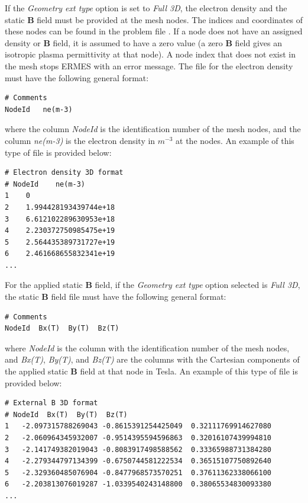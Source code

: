 If the \emph{Geometry ext type} option is set to \textit{Full 3D}, the electron density and the static \textbf{B} field must be provided at the mesh nodes. The indices and coordinates of these nodes can be found in the problem file . If a node does not have an assigned density or \textbf{B} field, it is assumed to have a zero value (a zero \textbf{B} field gives an isotropic plasma permittivity at that node). A node index that does not exist in the mesh stops ERMES with an error message. The file for the electron density must have the following general format:
\begin{small}\begin{lstlisting}
# Comments	 
NodeId   ne(m-3) 
\end{lstlisting}\end{small} 
where the column \textit{NodeId} is the identification number of the mesh nodes, and the column \textit{ne(m-3)} is the electron density in $m^{-3}$ at the nodes. An example of this type of file is provided below:
\begin{small}\begin{lstlisting}
# Electron density 3D format
# NodeId    ne(m-3)
1    0
2    1.994428193439744e+18
3    6.612102289630953e+18
4    2.230372750985475e+19
5    2.564435389731727e+19
6    2.461668655832341e+19
...
\end{lstlisting}\end{small} 
For the applied static \textbf{B} field, if the \emph{Geometry ext type} option selected is \textit{Full 3D}, the static \textbf{B} field file must have the following general format:
\begin{small}\begin{lstlisting}
# Comments	 
NodeId  Bx(T)  By(T)  Bz(T)
\end{lstlisting}\end{small} 
where \textit{NodeId} is the column with the identification number of the mesh nodes, and \textit{Bx(T)}, \textit{By(T)}, and \textit{Bz(T)} are the columns with the Cartesian components of the applied static \textbf{B} field at that node in Tesla. An example of this type of file is provided below:
\begin{small}\begin{lstlisting}
# External B 3D format
# NodeId  Bx(T)  By(T)  Bz(T)
1   -2.097315788269043 -0.8615391254425049  0.32111769914627080
2   -2.060964345932007 -0.9514395594596863  0.32016107439994810
3   -2.141749382019043 -0.8083917498588562  0.33365988731384280
4   -2.279344797134399 -0.6750744581222534  0.36515107750892640
5   -2.329360485076904 -0.8477968573570251  0.37611362338066100
6   -2.203813076019287 -1.0339540243148800  0.38065534830093380
...
\end{lstlisting}\end{small} 
